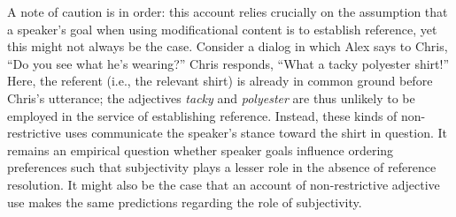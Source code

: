 \documentclass[preprint,authoryear]{elsarticle}\frenchspacing
\newcommand{\jd}[1]{\textcolor{Blue}{[jd: #1]}}
\newcommand{\gcs}[1]{\textcolor{blue}{[gcs: #1]}}
\begin{document}
A note of caution is in order: this account relies crucially on the assumption that a speaker's goal when using modificational content is to establish reference, yet this might not always be the case.  Consider a dialog in which Alex says to Chris, ``Do you see what he's wearing?'' Chris responds, ``What a tacky polyester shirt!'' Here, the referent (i.e., the relevant shirt) is already in common ground before Chris's utterance; the adjectives \emph{tacky} and \emph{polyester} are thus unlikely to be employed in the service of establishing reference. Instead, these kinds of non-restrictive uses communicate the speaker's stance toward the shirt in question. It remains an empirical question whether speaker goals influence ordering preferences such that subjectivity plays a lesser role in the absence of reference resolution. It might also be the case that an account of non-restrictive adjective use makes the same predictions regarding the role of subjectivity. %
\end{document}
